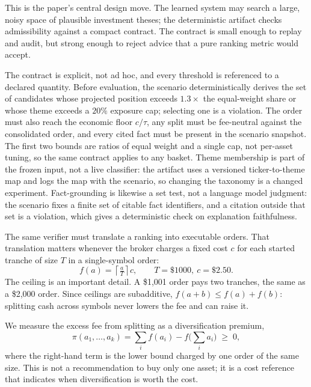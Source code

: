 \documentclass[sigconf,review,anonymous]{acmart}
\begin{document}
This is the paper's central design move. The learned system may search a large, noisy space of plausible investment theses; the deterministic artifact checks admissibility against a compact contract. The contract is small enough to replay and audit, but strong enough to reject advice that a pure ranking metric would accept.

The contract is explicit, not ad hoc, and every threshold is referenced to a declared quantity. Before evaluation, the scenario deterministically derives the set of candidates whose projected position exceeds $1.3\times$ the equal-weight share or whose theme exceeds a $20\%$ exposure cap; selecting one is a violation. The order must also reach the economic floor $c/\tau$, any split must be fee-neutral against the consolidated order, and every cited fact must be present in the scenario snapshot. The first two bounds are ratios of equal weight and a single cap, not per-asset tuning, so the same contract applies to any basket. Theme membership is part of the frozen input, not a live classifier: the artifact uses a versioned ticker-to-theme map and logs the map with the scenario, so changing the taxonomy is a changed experiment. Fact-grounding is likewise a set test, not a language model judgment: the scenario fixes a finite set of citable fact identifiers, and a citation outside that set is a violation, which gives a deterministic check on explanation faithfulness.

The same verifier must translate a ranking into executable orders. That translation matters whenever the broker charges a fixed cost $c$ for each started tranche of size $T$ in a single-symbol order:
\begin{equation}
f(a) = \left\lceil \tfrac{a}{T} \right\rceil c,
  \qquad T = \$1000,\ c = \$2.50.
  \label{eq:fee}
\end{equation}
The ceiling is an important detail. A \$1{,}001 order pays two tranches, the same as a \$2{,}000 order. Since ceilings are subadditive, $f(a+b)\le f(a)+f(b)$: splitting cash across symbols never lowers the fee and can raise it.

We measure the excess fee from splitting as a diversification premium,
\begin{equation}
\pi(a_1,\dots,a_k) = \sum_i f(a_i) - f\!\Big(\sum_i a_i\Big) \;\ge\; 0,
  \label{eq:premium}
\end{equation}
where the right-hand term is the lower bound charged by one order of the same size. This is not a recommendation to buy only one asset; it is a cost reference that indicates when diversification is worth the cost.
\end{document}
